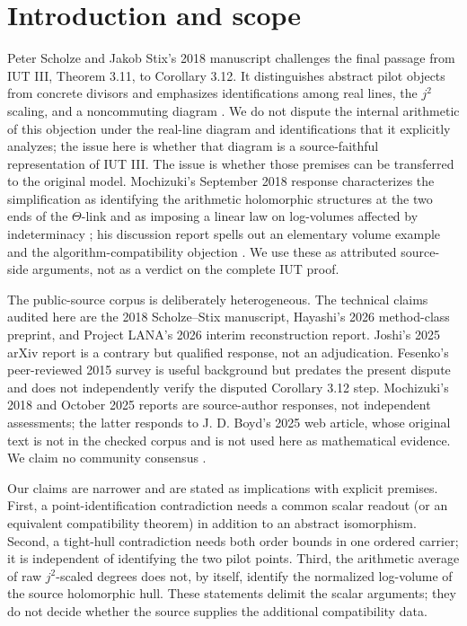 \documentclass[11pt]{article}
\begin{document}
\section{Introduction and scope}
Peter Scholze and Jakob Stix's 2018 manuscript challenges the final passage from IUT III, Theorem 3.11, to Corollary 3.12. It distinguishes abstract pilot objects from concrete divisors and emphasizes identifications among real lines, the $j^2$ scaling, and a noncommuting diagram \cite[Sections 2.1.6--2.2, equations (1.5)--(1.6)]{SS}. We do not dispute the internal arithmetic of this objection under the real-line diagram and identifications that it explicitly analyzes; the issue here is whether that diagram is a source-faithful representation of IUT III. The issue is whether those premises can be transferred to the original model. Mochizuki's September 2018 response characterizes the simplification as identifying the arithmetic holomorphic structures at the two ends of the $\Theta$-link and as imposing a linear law on log-volumes affected by indeterminacy \cite[(C12)--(C14), pp.~3--4]{MochizukiResponse}; his discussion report spells out an elementary volume example and the algorithm-compatibility objection \cite[SSId, SSIdFs, SSIdEx, pp.~16--19; ADItw, MlLV, LVEx, pp.~23--26]{MochizukiReport2018}. We use these as attributed source-side arguments, not as a verdict on the complete IUT proof.

The public-source corpus is deliberately heterogeneous. The technical claims audited here are the 2018 Scholze--Stix manuscript, Hayashi's 2026 method-class preprint, and Project LANA's 2026 interim reconstruction report. Joshi's 2025 arXiv report is a contrary but qualified response, not an adjudication. Fesenko's peer-reviewed 2015 survey is useful background but predates the present dispute and does not independently verify the disputed Corollary 3.12 step. Mochizuki's 2018 and October 2025 reports are source-author responses, not independent assessments; the latter responds to J. D. Boyd's 2025 web article, whose original text is not in the checked corpus and is not used here as mathematical evidence. We claim no community consensus \cite{Hayashi,LANA,Joshi,Fesenko2015,MochizukiReport2025}.

Our claims are narrower and are stated as implications with explicit premises. First, a point-identification contradiction needs a common scalar readout (or an equivalent compatibility theorem) in addition to an abstract isomorphism. Second, a tight-hull contradiction needs both order bounds in one ordered carrier; it is independent of identifying the two pilot points. Third, the arithmetic average of raw $j^2$-scaled degrees does not, by itself, identify the normalized log-volume of the source holomorphic hull. These statements delimit the scalar arguments; they do not decide whether the source supplies the additional compatibility data.
\end{document}
